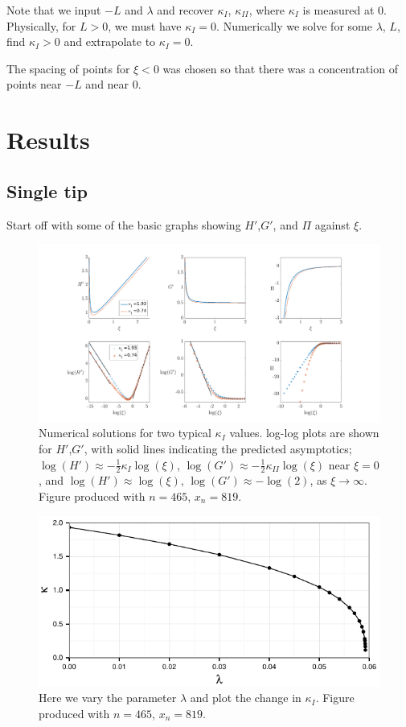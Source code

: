 \documentclass{jfm}
\begin{document}
Note that we input $-L$ and $\lambda$ and recover $\kappa_I$, $\kappa_{II}$, where 
$\kappa_I$ is measured at $0$. Physically, for $L>0$, we must have
$\kappa_I=0$. Numerically we solve for some $\lambda$, $L$, find $\kappa_I >0$ 
and extrapolate to $\kappa_I=0$.

The spacing of points for $\xi<0$ was chosen so that there was a concentration
of points near $-L$ and near $0$.

%
%
% 
\clearpage
\section{Results}\label{sec:Results}
%
%
%
\subsection{Single tip}
Start off with some of the basic graphs showing $H'$,$G'$, and $\Pi$ against
$\xi$.
\begin{figure}
  \centerline{\includegraphics[scale=0.3]{./../../Graphs/hprime-p-x-full.png}}
  \caption{Numerical solutions for two typical $\kappa_I$ values. log-log plots
           are shown for $H'$,$G'$, with solid lines indicating the predicted 
           asymptotics; $\log(H') \approx -\frac{1}{2}\kappa_I \log(\xi)$, 
           $\log(G') \approx -\frac{1}{2} \kappa_{II}\log(\xi)$ near $\xi=0$, 
           and $\log(H') \approx \log(\xi)$, $\log(G') \approx -\log(2)$, as 
           $\xi \to \infty$. Figure produced with $n=465$, $x_n=819$.}
\end{figure}
\begin{figure}
  \centerline{\includegraphics{./../../Graphs/K-lambda.pdf}}
  \caption{Here we vary the parameter $\lambda$ and plot the change in 
           $\kappa_I$. Figure produced with $n=465$, $x_n = 819$.}
\end{figure}
\end{document}
